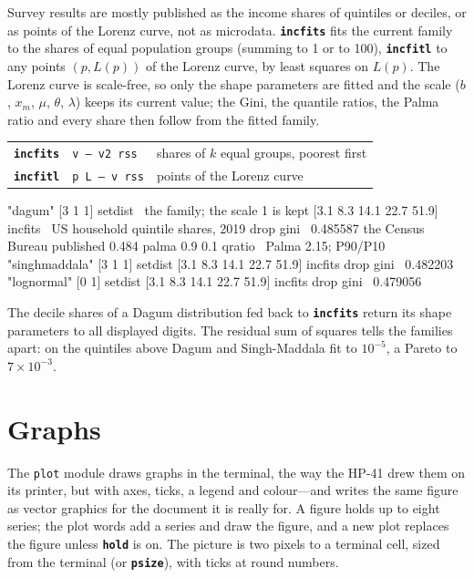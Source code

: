\documentclass[11pt,letterpaper]{article}
\newcommand{\code}[1]{\texttt{#1}}
\newcommand{\cmd}[1]{\texttt{\textbf{#1}}}
\newcommand{\stk}[1]{\texttt{#1}}
\begin{document}
Survey results are mostly published as the income shares of quintiles or deciles, or as points of the Lorenz curve, not as microdata. \cmd{incfits} fits the current family to the shares of equal population groups (summing to 1 or to 100), \cmd{incfitl} to any points $(p, L(p))$ of the Lorenz curve, by least squares on $L(p)$. The Lorenz curve is scale-free, so only the shape parameters are fitted and the scale ($b$, $x_m$, $\mu$, $\theta$, $\lambda$) keeps its current value; the Gini, the quantile ratios, the Palma ratio and every share then follow from the fitted family.
\begin{center}
\begin{tabular}{@{}l>{\raggedright\arraybackslash}p{}>{\raggedright\arraybackslash}p{}@{}}
\toprule
\cmd{incfits} & \stk{v -- v2 rss} & shares of $k$ equal groups, poorest first \\
\cmd{incfitl} & \stk{p L -- v rss} & points of the Lorenz curve \\
\bottomrule
\end{tabular}
\end{center}
\begin{rpn}
"dagum" [3 1 1] setdist                  \ the family; the scale 1 is kept
[3.1 8.3 14.1 22.7 51.9] incfits         \ US household quintile shares, 2019
drop gini                                \ 0.485587   the Census Bureau published 0.484
palma 0.9 0.1 qratio                     \ Palma 2.15; P90/P10
"singhmaddala" [3 1 1] setdist [3.1 8.3 14.1 22.7 51.9] incfits drop gini   \ 0.482203
"lognormal" [0 1] setdist [3.1 8.3 14.1 22.7 51.9] incfits drop gini        \ 0.479056
\end{rpn}
The decile shares of a Dagum distribution fed back to \cmd{incfits} return its shape parameters to all displayed digits. The residual sum of squares tells the families apart: on the quintiles above Dagum and Singh-Maddala fit to $10^{-5}$, a Pareto to $7\times10^{-3}$.

\section{Graphs}
\label{sec:plot}

The \code{plot} module draws graphs in the terminal, the way the HP-41 drew them on its printer, but with axes, ticks, a legend and colour---and writes the same figure as vector graphics for the document it is really for. A figure holds up to eight series; the plot words add a series and draw the figure, and a new plot replaces the figure unless \cmd{hold} is on. The picture is two pixels to a terminal cell, sized from the terminal (or \cmd{psize}), with ticks at round numbers.
\end{document}

